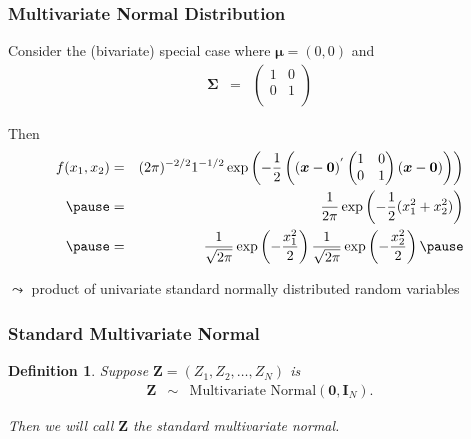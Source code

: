 \documentclass[handout]{beamer}
\newtheorem{defn}{Definition}
\numberwithin{equation}{section}
\begin{document}
\begin{frame}
\frametitle{Multivariate Normal Distribution}

Consider the (bivariate) special case where $\boldsymbol{\mu} = (0, 0)$ and 
\begin{eqnarray}
\boldsymbol{\Sigma} & = & \begin{pmatrix} 
1 & 0 \\
0 & 1 \\
\end{pmatrix}
\nonumber 
\end{eqnarray}

\pause 
Then 
\begin{eqnarray}
f(x_{1}, x_{2} ) & = & (2\pi)^{-2/2} 1^{-1/2} \exp\left(-\frac{1}{2}\left( (\boldsymbol{x}  - \boldsymbol{0} ) ^{'} \begin{pmatrix} 
1 & 0 \\
0 & 1 \\
\end{pmatrix}
(\boldsymbol{x}  - \boldsymbol{0} ) \right) \right) \nonumber \\ \pause 
& = & \frac{1}{2\pi} \exp\left(-\frac{1}{2} (x_{1}^{2} + x_{2} ^ 2 )     \right) \nonumber \\ \pause 
& = & \frac{1}{\sqrt{2\pi}} \exp\left(-\frac{x_{1}^{2}}{2}  \right) \frac{1}{\sqrt{2\pi}} \exp\left(-\frac{x_{2}^{2}}{2}  \right) \nonumber \pause 
\end{eqnarray}

$\leadsto$ product of univariate standard normally distributed random variables

\end{frame}


\begin{frame}
\frametitle{Standard Multivariate Normal}

\begin{defn}

Suppose $\boldsymbol{Z} = (Z_{1}, Z_{2}, \hdots, Z_{N}) $ is 
\begin{eqnarray}
\boldsymbol{Z} & \sim & \text{Multivariate Normal}(\boldsymbol{0}, \boldsymbol{I}_{N} ) . \nonumber
\end{eqnarray}

Then we will call $\boldsymbol{Z}$ the standard multivariate normal.  
\end{defn}



\end{frame}
\end{document}
